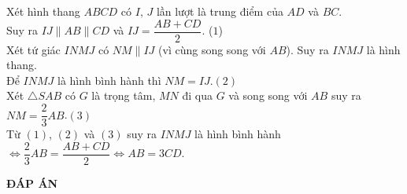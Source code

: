 \begin{bt}
{{		}
	Xét hình thang $ABCD$ có $I,\,J$ lần lượt là trung điểm của $AD$ và $BC$. \\
	Suy ra $IJ \parallel AB \parallel CD$ và $IJ=\dfrac{AB+CD}{2}$. \hfill($1$)\\
	Xét tứ giác $INMJ$ có $NM\parallel IJ$ (vì cùng song song với $AB$). Suy ra $INMJ$ là hình thang.\\
	 Để $INMJ$ là hình bình hành thì $NM=IJ$.\hfill$(2)$\\
	Xét $\triangle SAB$ có $G$ là trọng tâm, $MN$ đi qua $G$ và song song với $AB$ suy ra $NM=\dfrac{2}{3}AB$.\hfill$(3)$\\
	Từ $(1)$, $(2)$ và $(3)$ suy ra $INMJ$ là hình bình hành $ \Leftrightarrow \dfrac{2}{3}AB=\dfrac{AB+CD}{2} \Leftrightarrow AB=3CD$.
	
	}
\end{bt}


\newpage
\begin{center}
	\textbf{ĐÁP ÁN}
\end{center}
\begin{multicols}{10}
	
\end{multicols}


